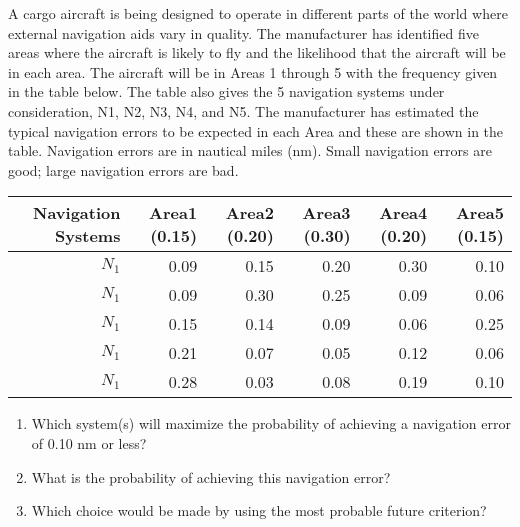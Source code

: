 \begin{exercises}
    \begin{exercise}
    \label{sea-7-40}
        A cargo aircraft is being designed to operate in different parts of the world where external navigation aids vary in quality.  The manufacturer has identified five areas where the aircraft is likely to fly and the likelihood that the aircraft will be in each area. The aircraft will be in Areas 1 through 5 with the frequency given in the table below. The table also gives the 5 navigation systems under consideration, N1, N2, N3, N4, and N5. The manufacturer has estimated the typical navigation errors to be expected in each Area and these are shown in the table. Navigation errors are in nautical miles (nm). Small navigation errors are good; large navigation errors are bad.
        \begin{table}[h]
        \centering
        \begin{tabular}{r r r r r r}
        \toprule
        \textbf{Navigation Systems} & \textbf{Area1 (0.15)} & \textbf{Area2 (0.20)} & \textbf{Area3 (0.30)} & \textbf{Area4 (0.20)} & \textbf{Area5 (0.15)} \\
        \midrule
        $N_1$ & 0.09 & 0.15 & 0.20 & 0.30 & 0.10 \\
        $N_1$ & 0.09 & 0.30 & 0.25 & 0.09 & 0.06 \\
        $N_1$ & 0.15 & 0.14 & 0.09 & 0.06 & 0.25 \\
        $N_1$ & 0.21 & 0.07 & 0.05 & 0.12 & 0.06 \\
        $N_1$ & 0.28 & 0.03 & 0.08 & 0.19 & 0.10 \\
        \bottomrule
        \end{tabular}
        \label{tab:sea-7-40} %
        \end{table}
        \begin{enumerate}[label=\alph*)]
            \item Which system(s) will maximize the probability of achieving a navigation error of 0.10 nm or less?
            \item What is the probability of achieving this navigation error?
            \item Which choice would be made by using the most probable future criterion?
        \end{enumerate}
    \end{exercise}
    \begin{solution}
    \end{solution}
    

\end{exercises}
